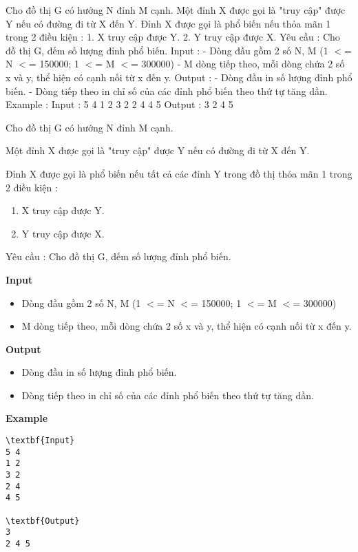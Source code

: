 

Cho đồ thị G có hướng N đỉnh M cạnh. Một đỉnh X được gọi là "truy cập" được Y nếu có đường đi từ X đến Y. Đỉnh X được gọi là phổ biến nếu thỏa mãn 1 trong 2 điều kiện : 1. X truy cập được Y. 2. Y truy cập được X. Yêu cầu : Cho đồ thị G, đếm số lượng đỉnh phổ biến. Input : - Dòng đầu gồm 2 số N, M (1 $<$= N $<$= 150000; 1 $<$= M $<$= 300000) - M dòng tiếp theo, mỗi dòng chứa 2 số x và y, thể hiện có cạnh nối từ x đến y. Output : - Dòng đầu in số lượng đỉnh phổ biến. - Dòng tiếp theo in chỉ số của các đỉnh phổ biến theo thứ tự tăng dần. Example : Input : 5 4 1 2 3 2 2 4 4 5 Output : 3 2 4 5

Cho đồ thị G có hướng N đỉnh M cạnh.

Một đỉnh X được gọi là "truy cập" được Y nếu có đường đi từ X đến Y.

Đỉnh X được gọi là phổ biến nếu tất cả các đỉnh Y trong đồ thị thỏa mãn 1 trong 2 điều kiện :
\begin{enumerate}
	\item X truy cập được Y.
	\item Y truy cập được X.
\end{enumerate}

Yêu cầu : Cho đồ thị G, đếm số lượng đỉnh phổ biến.

\textbf{Input}
\begin{itemize}
	\item Dòng đầu gồm 2 số N, M (1 $<$= N $<$= 150000; 1 $<$= M $<$= 300000)
	\item M dòng tiếp theo, mỗi dòng chứa 2 số x và y, thể hiện có cạnh nối từ x đến y.
\end{itemize}

\textbf{Output}
\begin{itemize}
	\item Dòng đầu in số lượng đỉnh phổ biến.
	\item Dòng tiếp theo in chỉ số của các đỉnh phổ biến theo thứ tự tăng dần.
\end{itemize}

\textbf{Example}
\begin{verbatim}
\textbf{Input}
5 4
1 2
3 2
2 4
4 5

\textbf{Output}
3
2 4 5

\end{verbatim}